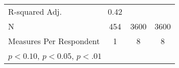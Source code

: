 {\begin{center}
{\begin{longtable}{l*{3}{c}}
            R-squared Adj.                     & 0.42                        &                             &                             \\
            N                                  & 454                         & 3600                        & 3600                        \\
            Measures Per Respondent            & 1                           & 8                           & 8                           \\
            \hline
            \multicolumn{4}{l}{\footnotesize \sym{*} \(p<0.10\), \sym{**} \(p<0.05\), \sym{***} \(p<.01\)}                               \\
        \end{longtable}
    }
\end{center}
}
